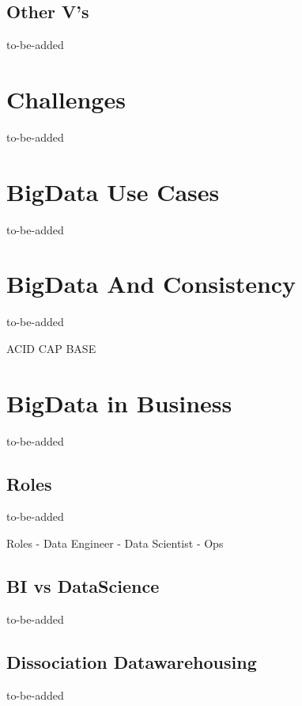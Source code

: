 \subsection{Other V's}
\label{bd_vs_other_vs}
to-be-added

\section{Challenges}
\label{bd_def}
to-be-added

\section{BigData Use Cases}
\label{bd_def}
to-be-added

\section{BigData And Consistency}
\label{bd_consistency}
to-be-added

ACID
CAP
BASE

\section{BigData in Business}
\label{bd_bdib}
to-be-added

\subsection{Roles}
\label{bd_bdib_roles}
to-be-added

Roles
- Data Engineer
- Data Scientist
- Ops

\subsection{BI vs DataScience}
\label{bd_bdib_bi_vs_datascience}
to-be-added


\subsection{Dissociation Datawarehousing}
\label{bd_bdib_diss_dwh}
to-be-added

